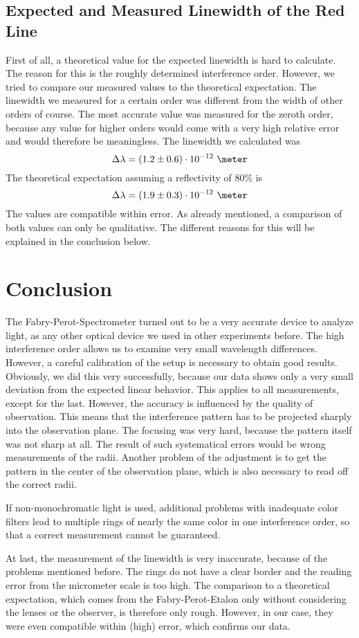 \documentclass[a4paper,10pt]{article}
\begin{document}
\subsection{Expected and Measured Linewidth of the Red Line}
First of all, a theoretical value for the expected linewidth is hard to calculate. The reason for this is the roughly determined interference order. However, we tried to compare our measured values to the theoretical expectation. The linewidth we measured for a certain order was different from the width of other orders of course. The most accurate value was measured for the zeroth order, because any value for higher orders would come with a very high relative error and would therefore be meaningless. The linewidth we calculated was
\begin{equation*}
\Delta \lambda = (1.2 \pm 0.6) \cdot 10^{-12} \text{ \meter}
\end{equation*}
The theoretical expectation assuming a reflectivity of 80\% is
\begin{equation*}
\Delta \lambda = (1.9 \pm 0.3) \cdot 10^{-12} \text{ \meter}
\end{equation*}
The values are compatible within error. As already mentioned, a comparison of both values can only be qualitative. The different reasons for this will be explained in the conclusion below.


\section{Conclusion}
The Fabry-Perot-Spectrometer turned out to be a very accurate device to analyze light, as any other optical device we used in other experiments before. The high interference order allows us to examine very small wavelength differences. However, a careful calibration of the setup is necessary to obtain good results. Obviously, we did this very successfully, because our data shows only a very small deviation from the expected linear behavior. This applies to all measurements, except for the last. However, the accuracy is influenced by the quality of observation. This means that the interference pattern has to be projected sharply into the observation plane. The focusing was very hard, because the pattern itself was not sharp at all. The result of such systematical errors would be wrong measurements of the radii. Another problem of the adjustment is to get the pattern in the center of the observation plane, which is also necessary to read off the correct radii.

If non-monochromatic light is used, additional problems with inadequate color filters lead to multiple rings of nearly the same color in one interference order, so that a correct measurement cannot be guaranteed.

At last, the measurement of the linewidth is very inaccurate, because of the problems mentioned before. The rings do not have a clear border and the reading error from the micrometer scale is too high. The comparison to a theoretical expectation, which comes from the Fabry-Perot-Etalon only without considering the lenses or the observer, is therefore only rough. However, in our case, they were even compatible within (high) error, which confirms our data.
\end{document}
